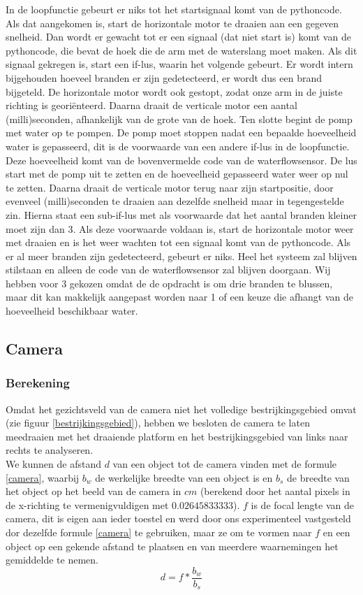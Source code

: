 \documentclass[kulak]{kulakarticle} %
\begin{document}
		In de loopfunctie gebeurt er niks tot het startsignaal komt van de pythoncode. Als dat aangekomen is, start de horizontale motor te draaien aan een gegeven snelheid. Dan wordt er gewacht tot er een signaal (dat niet start is) komt van de pythoncode, die bevat de hoek die de arm met de waterslang moet maken. Als dit signaal gekregen is, start een if-lus, waarin het volgende gebeurt. Er wordt intern bijgehouden hoeveel branden er zijn gedetecteerd, er wordt dus een brand bijgeteld. De horizontale motor wordt ook gestopt, zodat onze arm in de juiste richting is georiënteerd. Daarna draait de verticale motor een aantal (milli)seconden, afhankelijk van de grote van de hoek. Ten slotte begint de pomp met water op te pompen.
		De pomp moet stoppen nadat een bepaalde hoeveelheid water is gepasseerd, dit is de voorwaarde van een andere if-lus in de loopfunctie. Deze hoeveelheid komt van de bovenvermelde code van de waterflowsensor. De lus start met de pomp uit te zetten en de hoeveelheid gepasseerd water weer op nul te zetten. Daarna draait de verticale motor terug naar zijn startpositie, door evenveel (milli)seconden te draaien aan dezelfde snelheid maar in tegengestelde zin. Hierna staat een sub-if-lus met als voorwaarde dat het aantal branden kleiner moet zijn dan 3. Als deze voorwaarde voldaan is, start de horizontale motor weer met draaien en is het weer wachten tot een signaal komt van de pythoncode. Als er al meer branden zijn gedetecteerd, gebeurt er niks. Heel het systeem zal blijven stilstaan en alleen de code van de waterflowsensor zal blijven doorgaan. Wij hebben voor 3 gekozen omdat de de opdracht is om drie branden te blussen, maar dit kan makkelijk aangepast worden naar 1 of een keuze die afhangt van de hoeveelheid beschikbaar water.     
		

	\subsection{Camera}
		\subsubsection{Berekening}
			Omdat het gezichtsveld van de camera niet het volledige bestrijkingsgebied omvat (zie figuur \ref{bestrijkingsgebied}), hebben we besloten de camera te laten meedraaien met het draaiende platform en het bestrijkingsgebied van links naar rechts te analyseren. \\

			We kunnen de afstand \(d\) van een object tot de camera vinden met de formule \ref{camera}, waarbij \(b_w\) de werkelijke breedte van een object is en \(b_s\) de breedte van het object op het beeld van de camera in \(cm\) (berekend door het aantal pixels in de x-richting te vermenigvuldigen met \(0.02645833333\)). \(f\) is de focal lengte van de camera, dit is eigen aan ieder toestel en werd door ons experimenteel vastgesteld dor dezelfde formule \ref{camera} te gebruiken, maar ze om te vormen naar \(f\) en een object op een gekende afstand te plaatsen en van meerdere waarnemingen het gemiddelde te nemen. 
				\begin{equation} \label{camera}
					d = f * \frac{b_w}{b_s}
				\end{equation}
\end{document}
